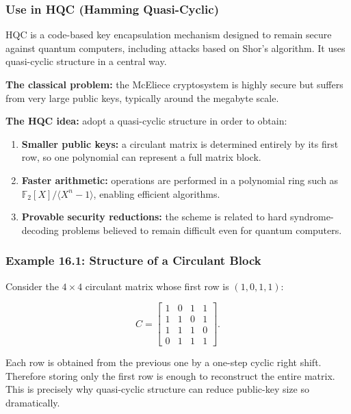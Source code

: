 \documentclass[11pt,oneside]{book}
\providecommand{\tightlist}{\setlength{\itemsep}{0pt}\setlength{\parskip}{0pt}}
\theoremstyle{plain}
\theoremstyle{definition}
\theoremstyle{remark}
\begin{document}
\subsubsection{Use in HQC (Hamming
Quasi-Cyclic)}\label{use-in-hqc-hamming-quasi-cyclic}

HQC is a code-based key encapsulation mechanism designed to remain
secure against quantum computers, including attacks based on Shor's
algorithm. It uses quasi-cyclic structure in a central way.

\textbf{The classical problem:} the McEliece cryptosystem is highly
secure but suffers from very large public keys, typically around the
megabyte scale.

\textbf{The HQC idea:} adopt a quasi-cyclic structure in order to
obtain:

\begin{enumerate}
\def\labelenumi{\arabic{enumi}.}
\tightlist
\item
  \textbf{Smaller public keys:} a circulant matrix is determined
  entirely by its first row, so one polynomial can represent a full
  matrix block.
\item
  \textbf{Faster arithmetic:} operations are performed in a polynomial
  ring such as \(\mathbb{F}_2[X]/\langle X^n-1 \rangle\), enabling
  efficient algorithms.
\item
  \textbf{Provable security reductions:} the scheme is related to hard
  syndrome-decoding problems believed to remain difficult even for
  quantum computers.
\end{enumerate}

\subsubsection{Example 16.1: Structure of a Circulant
Block}\label{example-16.1-structure-of-a-circulant-block}

Consider the \(4 \times 4\) circulant matrix whose first row is
\((1,0,1,1)\):

\[C = \begin{bmatrix}
1 & 0 & 1 & 1 \\
1 & 1 & 0 & 1 \\
1 & 1 & 1 & 0 \\
0 & 1 & 1 & 1
\end{bmatrix}.\]

Each row is obtained from the previous one by a one-step cyclic right
shift. Therefore storing only the first row is enough to reconstruct the
entire matrix. This is precisely why quasi-cyclic structure can reduce
public-key size so dramatically.
\end{document}
